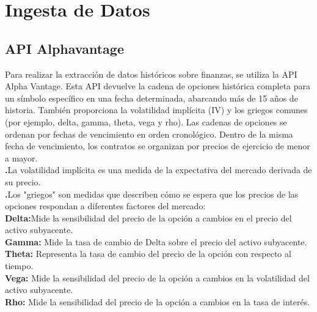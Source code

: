 \documentclass{article}
\begin{document}
    \section{Ingesta de Datos}
    \subsection{API Alphavantage }
   \begin{flushleft}
   	 Para realizar la extracción de datos históricos sobre finanzas, se utiliza la API Alpha Vantage. Esta API devuelve la cadena de opciones histórica completa para un símbolo específico en una fecha determinada, abarcando más de 15 años de historia. También proporciona la volatilidad implícita (IV) y los griegos comunes (por ejemplo, delta, gamma, theta, vega y rho). Las cadenas de opciones se ordenan por fechas de vencimiento en orden cronológico. Dentro de la misma fecha de vencimiento, los contratos se organizan por precios de ejercicio de menor a mayor.\\
   	 \vspace{0.5cm}
   	 \textbf{.}La volatilidad implícita es una medida de la expectativa del mercado derivada de su precio.\\
   	  \textbf{.}Los "griegos" son medidas que describen cómo se espera que los precios de las opciones respondan a diferentes factores del mercado:\\
   	 \vspace{0.5cm}
   	 \setlength{\parindent}{1.5cm}
   	 \textbf{Delta:}Mide la sensibilidad del precio de la opción a cambios en el precio del activo subyacente.\\
   	 
    \textbf{	Gamma:} Mide la tasa de cambio de Delta sobre el precio del activo subyacente.\\
   	 
   	 \textbf{Theta:} Representa la tasa de cambio del precio de la opción con respecto al tiempo.\\
   	 
   	\textbf{ Vega:} Mide la sensibilidad del precio de la opción a cambios en la volatilidad del activo subyacente.\\
   	 
   	 \textbf{Rho:} Mide la sensibilidad del precio de la opción a cambios en la tasa de interés.
   \end{flushleft}
\end{document}
